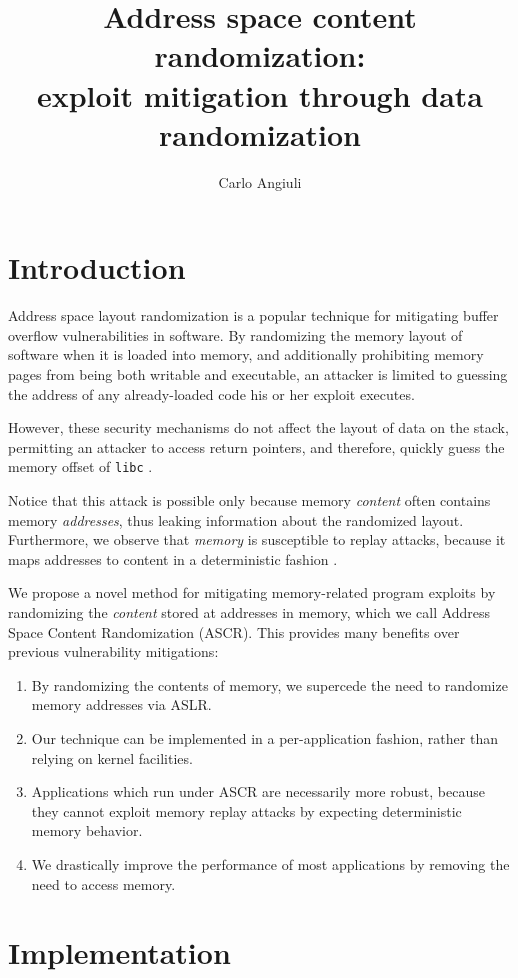 \documentclass[10pt,twocolumn]{article}
\title{Address space content randomization: \\
exploit mitigation through data randomization}
\author{Carlo Angiuli}
\renewcommand{\t}{\texttt}
\begin{document}
\maketitle

\section{Introduction}

Address space layout randomization \cite{PaX} is a popular technique for
mitigating buffer overflow vulnerabilities in software. By randomizing the
memory layout of software when it is loaded into memory, and additionally
prohibiting memory pages from being both writable and executable, an attacker is
limited to guessing the address of any already-loaded code his or her exploit
executes.

However, these security mechanisms do not affect the layout of data on the
stack, permitting an attacker to access return pointers, and therefore, quickly
guess the memory offset of \t{libc} \cite{ShachamEtAl}. 

Notice that this attack is possible only because memory \emph{content} often
contains memory \emph{addresses}, thus leaking information about the randomized
layout. Furthermore, we observe that \emph{memory} is susceptible to replay
attacks, because it maps addresses to content in a deterministic fashion
\cite{Eckhardt}.

We propose a novel method for mitigating memory-related program exploits by
randomizing the \emph{content} stored at addresses in memory, which we call
Address Space Content Randomization (ASCR). This provides many benefits over
previous vulnerability mitigations:
\begin{enumerate}
\item By randomizing the contents of memory, we supercede the need to randomize
memory addresses via ASLR.
\item Our technique can be implemented in a per-application fashion, rather than
relying on kernel facilities.
\item Applications which run under ASCR are necessarily more robust, because
they cannot exploit memory replay attacks by expecting deterministic memory
behavior.
\item We drastically improve the performance of most applications by removing
the need to access memory.
\end{enumerate}

\section{Implementation}
\end{document}
